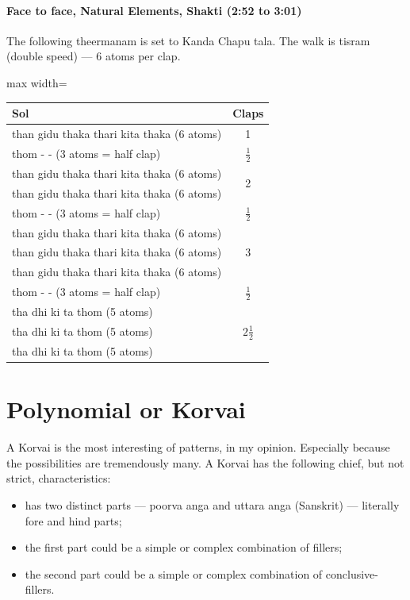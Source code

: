 \paragraph{Face to face, Natural Elements, Shakti (2:52 to 3:01)}
The following theermanam is set to Kanda Chapu tala. The walk is tisram (double speed)
--- 6 atoms per clap.

\begin{center}
\begin{adjustbox}{max width=\textwidth}
\begin{tabular}{l c}
\toprule
Sol & Claps\\
\midrule
than gidu thaka thari kita thaka (6 atoms) & 1\\
thom - - (3 atoms = half clap)             & $\frac{1}{2}$\\
\midrule
than gidu thaka thari kita thaka (6 atoms) & \multirow{2}{*}{2}\\
than gidu thaka thari kita thaka (6 atoms) & \\
thom - - (3 atoms = half clap)             & $\frac{1}{2}$\\
\midrule
than gidu thaka thari kita thaka (6 atoms) & \multirow{3}{*}{3}\\
than gidu thaka thari kita thaka (6 atoms) & \\
than gidu thaka thari kita thaka (6 atoms) & \\
thom - - (3 atoms = half clap)             & $\frac{1}{2}$\\
\midrule
tha dhi ki ta thom (5 atoms) & \multirow{3}{*}{$2\frac{1}{2}$}\\
tha dhi ki ta thom (5 atoms) & \\
tha dhi ki ta thom (5 atoms) & \\
\bottomrule
\end{tabular}
\end{adjustbox}
\end{center}

\section{Polynomial or Korvai}

A Korvai is the most interesting of patterns, in my opinion. Especially because the
possibilities are tremendously many. A Korvai has the following chief, but not
strict, characteristics:
\begin{itemize}
  \item has two distinct parts --- poorva anga and uttara anga (Sanskrit) ---
    literally fore and hind parts;
  \item the first part could be a simple or complex combination of fillers;
  \item the second part could be a simple or complex combination of conclusive-fillers.
\end{itemize}

